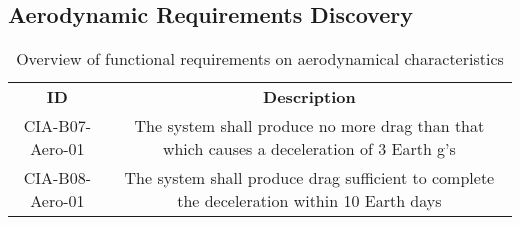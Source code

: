 \subsection{Aerodynamic Requirements Discovery} 
\label{sec:aero}




\begin{table}[h]
	\centering
	\caption{Overview of functional requirements on aerodynamical characteristics}
	\label{tab:aeroreqs}
	\begin{tabular}{|c|c|}
		\hline
		\textbf{ID} & \textbf{Description} \\
		CIA-B07-Aero-01 & The system shall produce no more drag than that which causes a deceleration of 3 Earth g's\\
		CIA-B08-Aero-01 & The system shall produce drag sufficient to complete the deceleration within 10 Earth days \\
		\hline
	\end{tabular}
\end{table}